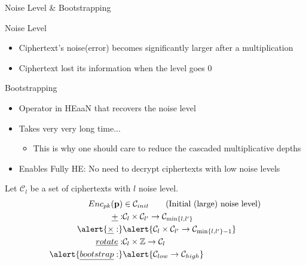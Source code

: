 \documentclass[9pt]{beamer}
\renewcommand{\vec}{\mathbf}
\begin{document}
\begin{frame}{Noise Level \& Bootstrapping}
    \begin{block}{Noise Level}
        \begin{itemize}
            \item Ciphertext's noise(error) becomes significantly larger after a multiplication
            \item Ciphertext lost its information when the level goes 0
        \end{itemize}
    \end{block}
    \begin{alertblock}{Bootstrapping}
        \begin{itemize}
            \item Operator in HEaaN that \alert{recovers the noise level}
            \item Takes very very long time...
                  \begin{itemize}
                      \item This is why one should care to \alert{reduce the cascaded multiplicative depths}
                  \end{itemize}
            \item Enables Fully HE: No need to decrypt ciphertexts with low noise levels
        \end{itemize}
    \end{alertblock}
    Let $\mathcal{C}_l$ be a set of ciphertexts with $l$ noise level.
    \begin{align*}
        Enc_{pk}(\vec p)               & \in \mathcal{C}_{init} \tag{Initial (large) noise level}                                   \\
        \underline{+}:                 & \mathcal{C}_{l} \times \mathcal{C}_{l'} \rightarrow \mathcal{C}_{\min\{l,l'\}}             \\
        \alert{\underline{\times}:}    & \alert{\mathcal{C}_{l} \times \mathcal{C}_{l'} \rightarrow \mathcal{C}_{\min\{l,l'\} - 1}} \\
        \underline{rotate}:            & \mathcal{C}_{l} \times \mathbb{Z} \rightarrow \mathcal{C}_{l}                              \\
        \alert{\underline{bootstrap}:} & \alert{\mathcal{C}_{low} \rightarrow \mathcal{C}_{high}}                                   \\
    \end{align*}
\end{frame}
\end{document}
